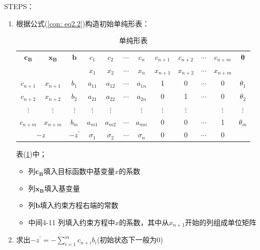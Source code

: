 \documentclass{book}
\begin{document}
STEPS：
\begin{enumerate}
    \item 根据公式(\ref{con: eq2.2})构造初始单纯形表：\\
    
    \begin{table}[h]
        \centering
        \begin{tabular}{c|c|c|cccccccc|c}
            \hline
             \multirow{2}{*}{$\boldsymbol{c_B}$}& \multirow{2}{*}{$\boldsymbol{x_B}$} & \multirow{2}{*}{$\boldsymbol{b}$} & $c_1$ & $c_2$ & $\cdots$ & $c_n$ & $c_{n+1}$ & $c_{n+2}$ & $\cdots$ & $c_{n+m}$ & \multirow{2}{*}{$\boldsymbol{\theta}$} \\
             \cline{4-11}
             &&& $x_1$ & $x_2$ & $\cdots$ & $x_n$ & $x_{n+1}$ & $x_{n+2}$ & $\cdots$ & $x_{n+m}$ &\\
             \hline
             $c_{n+1}$ & $x_{n+1}$ & $b_1$ & $a_{11}$ & $a_{12}$ & $\cdots$ & $a_{1n}$ & 1 & 0 & $\cdots$ & 0 & $\theta_1$\\
             $c_{n+2}$ & $x_{n+2}$ & $b_2$ & $a_{21}$ & $a_{22}$ & $\cdots$ & $a_{2n}$ & 0 & 1 & $\cdots$ & 0 & $\theta_2$\\
             $\vdots$ & $\vdots$ & $\vdots$ & $\vdots$ & $\vdots$ &  & $\vdots$ & $\vdots$ & $\vdots$ &  & $\vdots$ & $\vdots$\\
             $c_{n+m}$ & $x_{n+m}$ & $b_m$ & $a_{m1}$ & $a_{m2}$ & $\cdots$ & $a_{mn}$ & 0 & 0 & $\cdots$ & 1 & $\theta_m$\\
             \hline
             \multicolumn{2}{c|}{$-z$}  & $-z^{\prime}$ & $\sigma_1$ & $\sigma_2$ & $\cdots$ & $\sigma_n$ & 0 & 0 & $\cdots$ & 0 &\\
             \hline
        \end{tabular}
        \caption{单纯形表}
        \label{tab:label de SM}
    \end{table}
    表(\ref{tab:label de SM})中；
    \begin{itemize}
        \item 列$\boldsymbol{c_B}$填入目标函数中基变量$x$的系数
        \item 列$\boldsymbol{x_B}$填入基变量
        \item 列$\boldsymbol{b}$填入约束方程右端的常数
        \item 中间4-11 列填入约束方程中$x$的系数，其中从$x_{n+1}$开始的列组成单位矩阵
    \end{itemize}
    \item 求出$-z^{\prime}=-\sum\limits_{i=1}^mc_{n+i}b_i$(初始状态下一般为0)

\end{enumerate}
\end{document}
